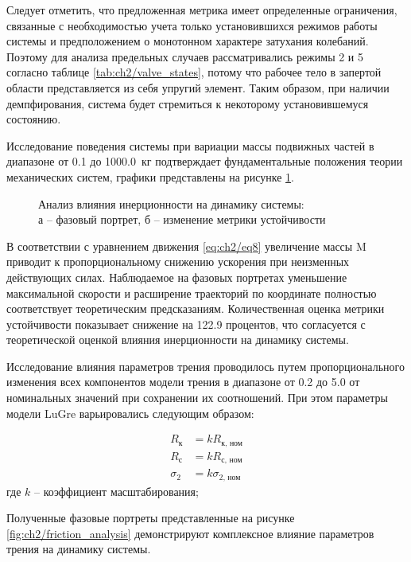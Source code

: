 Следует отметить, что предложенная метрика имеет определенные ограничения, связанные
с необходимостью учета только установившихся режимов работы системы и предположением о 
монотонном характере затухания колебаний. Поэтому для анализа предельных случаев
рассматривались режимы 2 и 5 согласно таблице \ref{tab:ch2/valve_states}, потому что 
рабочее тело в запертой области представляется из себя упругий элемент. Таким образом,
при наличии демпфирования, система будет стремиться к некоторому установившемуся состоянию. 

Исследование поведения системы при вариации массы подвижных частей в диапазоне от \num{0.1} до \num{1000.0}~кг подтверждает
фундаментальные положения теории механических систем, графики представлены на рисунке \ref{fig:ch2/inertia_analysis}.
\begin{figure}[ht]
    \caption{Анализ влияния инерционности на динамику системы:\\ а -- фазовый портрет, б -- изменение метрики устойчивости}
    \label{fig:ch2/inertia_analysis}
\end{figure}

В соответствии с уравнением движения \ref{eq:ch2/eq8}
увеличение массы M приводит к пропорциональному снижению ускорения при неизменных действующих силах.
Наблюдаемое на фазовых портретах уменьшение максимальной скорости и расширение траекторий по координате полностью соответствует
теоретическим предсказаниям. Количественная оценка метрики устойчивости показывает снижение на \num{122.9} процентов, что согласуется
с теоретической оценкой влияния инерционности на динамику системы.

Исследование влияния параметров трения проводилось путем пропорционального изменения всех компонентов модели трения
в диапазоне от \num{0.2} до \num{5.0} от номинальных значений при сохранении их соотношений.
При этом параметры модели LuGre варьировались следующим образом:

\begin{equation*}
\begin{aligned}
R_\text{к} &= k R_\text{к,~ном} \\
R_\text{с} &= k R_\text{с,~ном} \\
\sigma_2 &= k \sigma_\text{2,~ном}
\end{aligned}
\end{equation*}
где $k$ -- коэффициент масштабирования;

Полученные фазовые портреты представленные на рисунке \ref{fig:ch2/friction_analysis} демонстрируют комплексное влияние параметров трения на
динамику системы. 

